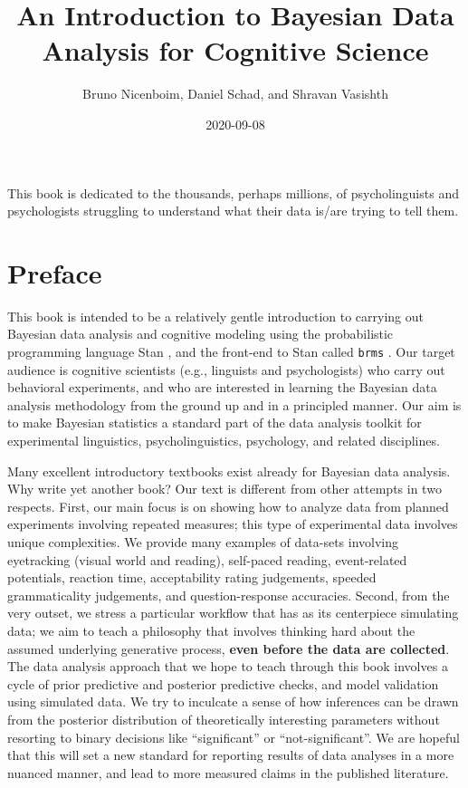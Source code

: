 \documentclass[12pt,]{krantz}
\title{An Introduction to Bayesian Data Analysis for Cognitive Science}
\author{Bruno Nicenboim, Daniel Schad, and Shravan Vasishth}
\date{2020-09-08}
\theoremstyle{definition}
\theoremstyle{definition}
\theoremstyle{definition}
\theoremstyle{remark}
\begin{document}
\maketitle

\thispagestyle{empty}
\begin{center}
This book is dedicated to the thousands, perhaps millions, of psycholinguists and psychologists struggling to understand what their data is/are trying to tell them.
\end{center}

\setlength{\abovedisplayskip}{-5pt}
\setlength{\abovedisplayshortskip}{-5pt}

{
\hypersetup{linkcolor=black}
\setcounter{tocdepth}{2}
\tableofcontents
}
\chapter*{Preface}\label{preface}


This book is intended to be a relatively gentle introduction to carrying
out Bayesian data analysis and cognitive modeling using the
probabilistic programming language Stan \citep{carpenter2017stan}, and
the front-end to Stan called \texttt{brms} \citep{R-brms}. Our target
audience is cognitive scientists (e.g., linguists and psychologists) who
carry out behavioral experiments, and who are interested in learning the
Bayesian data analysis methodology from the ground up and in a
principled manner. Our aim is to make Bayesian statistics a standard
part of the data analysis toolkit for experimental linguistics,
psycholinguistics, psychology, and related disciplines.

Many excellent introductory textbooks exist already for Bayesian data
analysis. Why write yet another book? Our text is different from other
attempts in two respects. First, our main focus is on showing how to
analyze data from planned experiments involving repeated measures; this
type of experimental data involves unique complexities. We provide many
examples of data-sets involving eyetracking (visual world and reading),
self-paced reading, event-related potentials, reaction time,
acceptability rating judgements, speeded grammaticality judgements, and
question-response accuracies. Second, from the very outset, we stress a
particular workflow that has as its centerpiece simulating data; we aim
to teach a philosophy that involves thinking hard about the assumed
underlying generative process, \textbf{even before the data are
collected}. The data analysis approach that we hope to teach through
this book involves a cycle of prior predictive and posterior predictive
checks, and model validation using simulated data. We try to inculcate a
sense of how inferences can be drawn from the posterior distribution of
theoretically interesting parameters without resorting to binary
decisions like ``significant'' or ``not-significant''. We are hopeful
that this will set a new standard for reporting results of data analyses
in a more nuanced manner, and lead to more measured claims in the
published literature.
\end{document}
